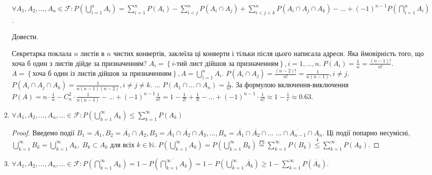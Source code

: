 \begin{enumerate}
    \begin{math}
        \forall A_1, A_2, \dots, A_n \in \mathcal{F} 
    : P(\bigcup_{i=1}^n A_i) = \sum_{i=1}^n P(A_i) - \sum_{i < j}^n P(A_i \cap A_j)
    + \sum_{i < j < k}^n P(A_i \cap A_j \cap A_k) - ... + (-1)^{n-1}P(\bigcap_{i=1}^n A_i)
    \end{math}.
    \begin{exercise}
        Довести.
    \end{exercise}
\begin{example}
    Секретарка поклала $n$ листів в $n$ чистих конвертів, заклеїла ці конверти і тільки 
    після цього написала адреси. Яка ймовірність того, що хоча б один з листів дійде 
    за призначенням?
    \newline
    $A_i = \left\{i\text{-тий лист дійшов за призначенням}\right\}, i = 
    1,...,n. \;P(A_i) = \frac{1}{n} = \frac{(n-1)!}{n!}$.
    \newline
    $A = \left\{\text{хоча б один із листів дійшов за призначенням}\right\}, 
    A = \bigcup_{i=1}^n A_i$.
    \newline
    $P(A_i \cap A_j) = \frac{(n-2)!}{n!} = \frac{1}{n(n-1)}, i \neq j$.
    \newline
    $P(A_i \cap A_j \cap A_k) = \frac{1}{n(n-1)(n-2)}, i \neq j \neq k$.
    \newline
    ...
    \newline
    $P(A_1 \cap ... \cap A_n) = \frac{1}{n!}$.
    \newline
    За формулою включення-виключення $P(A) = n\cdot \frac{1}{n} - C_n^2 \cdot \frac{1}{n(n-1)}- \dots + (-1)^{n-1}\frac{1}{n!}
    = 1 - \frac{1}{2!} + \frac{1}{3!} - \dots +(-1)^{n-1} \cdot \frac{1}{n!} \approx 
    1 - \frac{1}{e} \approx 0.63$.
\end{example}
    \item $\forall A_1, A_2, ..., A_n, ... \in \mathcal{F}: 
    P(\bigcup_{k=1}^\infty A_k) \leq \sum_{k=1}^\infty P(A_k)$
    \begin{proof}
        Введемо події $B_1 = A_1, B_2 = \overline{A_1} \cap A_2, 
        B_3 = \overline{A_1} \cap \overline{A_2} \cap A_3, ..., B_n = 
        \overline{A_1} \cap \overline{A_2} \cap ...$ 
        \newline
        $... \cap \overline{A_{n-1}} \cap A_n$. Ці події попарно несумісні, 
        $\bigcup_{k=1}^\infty B_k = \bigcup_{k=1}^\infty A_k,\;B_k \subset A_k $ для всіх $k \in \mathbb{N}$.
        \newline
        $P(\bigcup_{k=1}^\infty A_k) = P(\bigcup_{k=1}^\infty B_k) 
        \overset{P3}{=} \sum_{k=1}^\infty P(B_k) \overset{4}{\leq} 
        \sum_{k=1}^\infty P(A_k)$.
    \end{proof}
    \item $\forall A_1, A_2, ..., A_n, ... \in \mathcal{F}: P(\bigcap_{k=1}^\infty
    A_k) = 1 - P(\overline{\bigcap_{k=1}^\infty A_k}) = 1 - P(\bigcup_{k=1}^\infty \overline{A_k}) \geq  
    1 - \sum_{k=1}^\infty P(\overline{A_k})$.
\end{enumerate}

